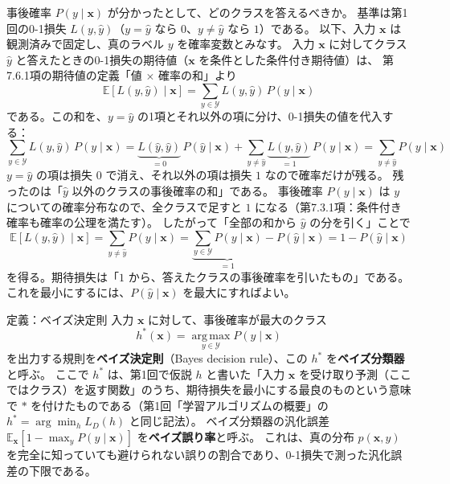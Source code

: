 事後確率 $P(y \mid \bm{x})$ が分かったとして、どのクラスを答えるべきか。
基準は第1回の0-1損失 $L(y, \hat{y})$（$y = \hat{y}$ なら $0$、$y \neq \hat{y}$ なら $1$）である。
以下、入力 $\bm{x}$ は観測済みで固定し、真のラベル $y$ を確率変数とみなす。
入力 $\bm{x}$ に対してクラス $\hat{y}$ と答えたときの0-1損失の期待値（$\bm{x}$ を条件とした条件付き期待値）は、
第7.6.1項の期待値の定義「値 $\times$ 確率の和」より
\begin{equation}
  \mathbb{E}[L(y, \hat{y}) \mid \bm{x}]
  = \sum_{y \in \mathcal{Y}} L(y, \hat{y})\,P(y \mid \bm{x})
  \label{eq:ch8-exp-loss-def}
\end{equation}
である。この和を、$y = \hat{y}$ の1項とそれ以外の項に分け、0-1損失の値を代入する：
\begin{equation}
  \sum_{y \in \mathcal{Y}} L(y, \hat{y})\,P(y \mid \bm{x})
  = \underbrace{L(\hat{y}, \hat{y})}_{= 0}\,P(\hat{y} \mid \bm{x})
  + \sum_{y \neq \hat{y}} \underbrace{L(y, \hat{y})}_{= 1}\,P(y \mid \bm{x})
  = \sum_{y \neq \hat{y}} P(y \mid \bm{x})
  \label{eq:ch8-exp-loss-split}
\end{equation}
$y = \hat{y}$ の項は損失 $0$ で消え、それ以外の項は損失 $1$ なので確率だけが残る。
残ったのは「$\hat{y}$ 以外のクラスの事後確率の和」である。
事後確率 $P(y \mid \bm{x})$ は $y$ についての確率分布なので、全クラスで足すと $1$ になる（第7.3.1項：条件付き確率も確率の公理を満たす）。
したがって「全部の和から $\hat{y}$ の分を引く」ことで
\begin{equation}
  \mathbb{E}[L(y, \hat{y}) \mid \bm{x}]
  = \sum_{y \neq \hat{y}} P(y \mid \bm{x})
  = \underbrace{\sum_{y \in \mathcal{Y}} P(y \mid \bm{x})}_{= 1} - P(\hat{y} \mid \bm{x})
  = 1 - P(\hat{y} \mid \bm{x})
  \label{eq:ch8-exp-loss}
\end{equation}
を得る。期待損失は「$1$ から、答えたクラスの事後確率を引いたもの」である。
これを最小にするには、$P(\hat{y} \mid \bm{x})$ を最大にすればよい。

\begin{itembox}[l]{定義：ベイズ決定則}
入力 $\bm{x}$ に対して、事後確率が最大のクラス
\begin{equation}
  h^*(\bm{x}) = \operatorname*{arg\,max}_{y \in \mathcal{Y}} P(y \mid \bm{x})
  \label{eq:ch8-bayes-rule}
\end{equation}
を出力する規則を\textbf{ベイズ決定則}（Bayes decision rule）、この $h^*$ を\textbf{ベイズ分類器}と呼ぶ。
ここで $h^*$ は、第1回で仮説 $h$ と書いた「入力 $\bm{x}$ を受け取り予測（ここではクラス）を返す関数」のうち、期待損失を最小にする最良のものという意味で $*$ を付けたものである（第1回「学習アルゴリズムの概要」の $h^* = \arg\min_h L_D(h)$ と同じ記法）。
ベイズ分類器の汎化誤差 $\mathbb{E}_{\bm{x}}[1 - \max_y P(y \mid \bm{x})]$ を\textbf{ベイズ誤り率}と呼ぶ。
これは、真の分布 $p(\bm{x}, y)$ を完全に知っていても避けられない誤りの割合であり、0-1損失で測った汎化誤差の下限である。
\end{itembox}

